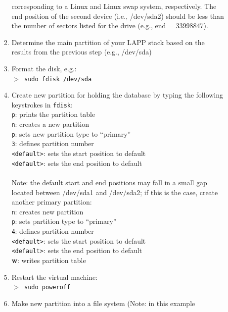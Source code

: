 \begin{enumerate}
\begin{enumerate}
\begin{enumerate}
    	           corresponding to a Linux and Linux swap system, respectively.
    	           The end position of the second device (i.e., /dev/sda2) should
    	           be less than the number of sectors listed for the drive (e.g., 
    	           end = 33998847).
            \item Determine the main partition of your LAPP stack based on the 
                  results from the previous step (e.g., /dev/sda)
            \item Format the disk, e.g.:\\
                     $>$~\texttt{sudo fdisk /dev/sda}
            \item Create new partition for holding the database by typing the following keystrokes in \texttt{fdisk}:\\
                  \texttt{p}: prints the partition table\\
                  \texttt{n}: creates a new partition\\
                  \texttt{p}: sets new partition type to ``primary''\\
                  \texttt{3}: defines partition number\\
                  \texttt{<default>}: sets the start position to default\\
                  \texttt{<default>}: sets the end position to default\\
                  \\
                  Note: the default start and end positions may fall in a small 
                  gap located between /dev/sda1 and /dev/sda2; if this is 
                  the case, create another primary partition:\\
                  \texttt{n}: creates new partition\\
                  \texttt{p}: sets partition type to ``primary''\\
                  \texttt{4}: defines partition number\\
                  \texttt{<default>}: sets the start position to default\\
                  \texttt{<default>}: sets the end position to default\\
                  \textbf{w}: writes partition table
            \item Restart the virtual machine:\\
                  $>$~\texttt{sudo poweroff}
            \item Make new partition into a file system (Note: in this example

\end{enumerate}
\end{enumerate}
\end{enumerate}
